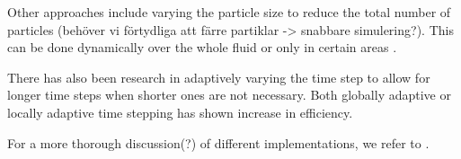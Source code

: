\documentclass[../../main.tex]{subfiles}
\begin{document}
Other approaches include varying the particle size to reduce the total number of particles (behöver vi förtydliga att färre partiklar -> snabbare simulering?). This can be done dynamically over the whole fluid \citep{adams2007adaptively,hong2008adaptive} or only in certain areas \citep{solenthaler2011two,horvath2013mass}. 

There has also been research in adaptively varying the time step to allow for longer time steps when shorter ones are not necessary. Both globally adaptive \citep{ihmsen2010boundary,goswami2011time} or locally adaptive \citep{goswami2014regional} time stepping has shown increase in efficiency. 


For a more thorough discussion(?) of different implementations, we refer to \citet{ihmsen2014sph}.
\end{document}
